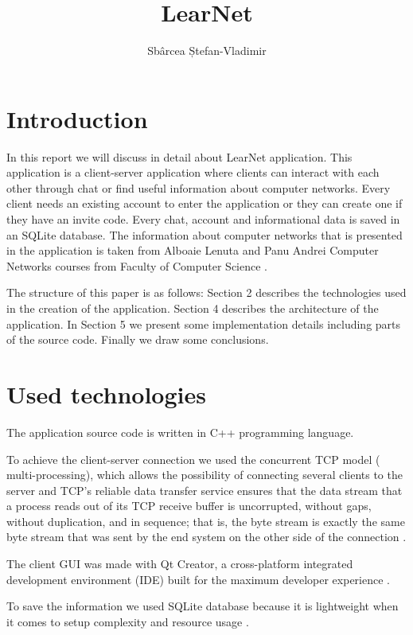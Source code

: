 \documentclass[runningheads]{llncs}
\title{LearNet}
\author{Sbârcea Ștefan-Vladimir}
\institute{ Faculty of Computer Science, Alexandru Ioan Cuza University of Iasi
\email{stefan.sbarcea@info.uaic.ro}}
\begin{document}
\maketitle

\section{Introduction}
\par In this report we will discuss in detail about LearNet application. This application is a client-server application where clients can interact with each other through chat or find useful information about computer networks. Every client needs an existing account to enter the application or they can create one if they have an invite code. Every chat, account and informational data is saved in an SQLite database. The information about computer networks that is presented in the application is taken from Alboaie Lenuta and Panu Andrei Computer Networks courses from Faculty of Computer Science \cite{computernetworks}.
\par The structure of this paper is as follows: Section 2 describes the technologies used in the creation of the application. Section 4 describes the architecture of the application. In Section 5 we present some implementation details including parts of the source code. Finally we draw some conclusions.

\section{Used technologies}
\par The application source code is written in C++ programming language.
\par To achieve the client-server connection we used the concurrent TCP model ( multi-processing), which allows the possibility of connecting several clients to the server and TCP’s reliable
data transfer service ensures that the data stream that a process reads out of its TCP receive buffer is uncorrupted, without gaps, without duplication, and in sequence; that is, the byte stream is exactly the same byte stream that was sent by the end system on the other side of the connection \cite{kurose1986computer}. 
\par The client GUI was made with Qt Creator, a cross-platform integrated development environment (IDE) built for the maximum developer experience \cite{qtcreator}. 
\par To save the information we used SQLite database because it is lightweight when it comes to setup complexity and resource usage \cite{kreibich2010using}. 
\end{document}
